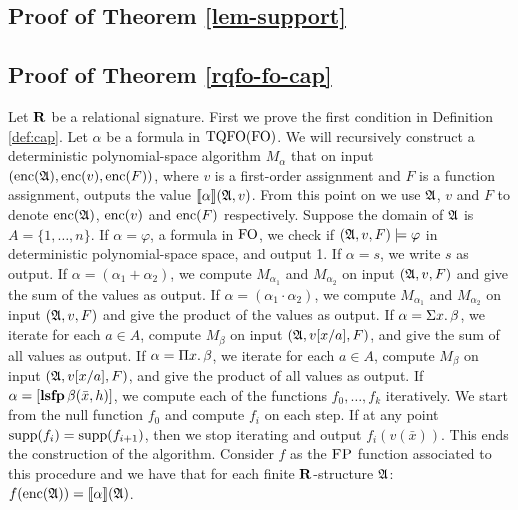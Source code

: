 \subsection*{Proof of Theorem \ref{lem-support}}



\subsection*{Proof of Theorem \ref{rqfo-fo-cap}}

Let $\mathbf{R}$ be a relational signature. First we prove the first condition in Definition \ref{def:cap}. Let $\alpha$ be a formula in ${\rm TQFO}({\rm FO})$.
We will recursively construct a deterministic polynomial-space algorithm $M_{\alpha}$ that on input $({\rm enc}(\mathfrak{A}),{\rm enc}(v),{\rm enc}(F))$, where $v$ is a first-order assignment and $F$ is a function assignment, outputs the value ${\llbracket{}{\alpha}\rrbracket}(\mathfrak{A},v)$.
From this point on we use $\mathfrak{A}$, $v$ and $F$ to denote ${\rm enc}(\mathfrak{A})$, ${\rm enc}(v)$ and ${\rm enc}(F)$ respectively.
Suppose the domain of $\mathfrak{A}$ is $A = \{1,\ldots,n\}$.
If $\alpha = \varphi$, a formula in ${\rm FO}$, we check if $(\mathfrak{A},v,F)\models\varphi$ in deterministic polynomial-space space, and output 1.
If $\alpha = s$, we write $s$ as output.
If $\alpha = (\alpha_1 + \alpha_2)$, we compute $M_{\alpha_1}$ and $M_{\alpha_2}$ on input $(\mathfrak{A},v,F)$ and give the sum of the values as output.
If $\alpha = (\alpha_1\cdot\alpha_2)$, we compute $M_{\alpha_1}$ and $M_{\alpha_2}$ on input $(\mathfrak{A},v,F)$ and give the product of the values as output.
If $\alpha = \Sigma{x}.\,\beta$, we iterate for each $a\in A$, compute $M_{\beta}$ on input $(\mathfrak{A},v[x/a],F)$, and give the sum of all values as output.
If $\alpha = \Pi{x}.\,\beta$, we iterate for each $a\in A$, compute $M_{\beta}$ on input $(\mathfrak{A},v[x/a],F)$, and give the product of all values as output.
If $\alpha = [{\bf lsfp} \, \beta(\bar{x},h)]$, we compute each of the functions $f_0,\ldots,f_k$ iteratively. We start from the null function $f_0$ and compute $f_i$ on each step. If at any point $\text{\rm supp}(f_i) = \text{\rm supp}(f_{i+1})$, then we stop iterating and output $f_i(v(\bar{x}))$.
This ends the construction of the algorithm.
Consider $f$ as the $\text{\sc FP}$ function associated to this procedure and we have that for each finite $\mathbf{R}$-structure $\mathfrak{A}$: $f({\rm enc}(\mathfrak{A})) = {\llbracket{}{\alpha}\rrbracket}(\mathfrak{A})$.

